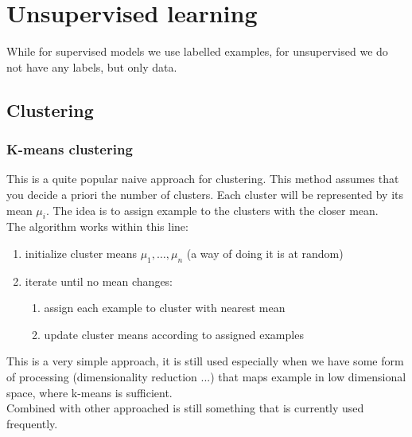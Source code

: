 \chapter{Unsupervised learning}
\label{cha:unsupervised}

While for supervised models we use labelled examples, for unsupervised we do not
have any labels, but only data.

\section{Clustering}

\subsection{K-means clustering}
This is a quite popular naive approach for clustering. This method assumes that
you decide a priori the number of clusters. Each cluster will be represented by its
mean $\mu_{i}$. The idea is to assign example to the clusters with the closer
mean.\\

The algorithm works within this line:
\begin{enumerate}
	\item initialize cluster means $\mu_{1}, \dots, \mu_{n}$ (a way of doing it is
		at random)

	\item iterate until no mean changes:
		\begin{enumerate}
			\item assign each example to cluster with nearest mean

			\item update cluster means according to assigned examples
		\end{enumerate}
\end{enumerate}

This is a very simple approach, it is still used especially when we have some
form of processing (dimensionality reduction ...) that maps example in low
dimensional space, where k-means is sufficient. \\ Combined with other
approached is still something that is currently used frequently.

